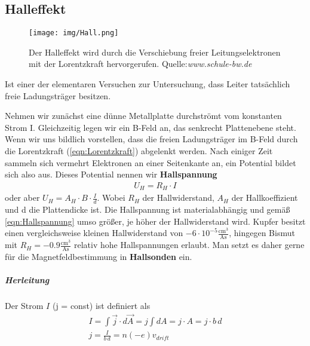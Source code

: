 \subsection{Halleffekt}
\begin{figure}\begin{center}
\texttt{[image: img/Hall.png]}\end{center}
\caption{Der Halleffekt wird durch die Verschiebung freier Leitungselektronen mit der Lorentzkraft hervorgerufen. Quelle:\textit{www.schule-bw.de} }
\label{pic:Halleffekt}
\end{figure}
Ist einer der elementaren Versuchen zur Untersuchung, dass Leiter tatsächlich  freie Ladungsträger besitzen. \par 
Nehmen wir zunächst eine dünne Metallplatte durchströmt vom konstanten Strom I. Gleichzeitig legen wir ein B-Feld an, das senkrecht Plattenebene steht. Wenn wir uns bildlich vorstellen, dass die freien Ladungsträger im B-Feld durch die Lorentzkraft (\ref{eqn:Lorentzkraft}) abgelenkt werden. Nach einiger Zeit sammeln sich vermehrt Elektronen an einer Seitenkante an, ein Potential bildet sich also aus. Dieses Potential nennen wir \textbf{Hallspannung}
\begin{align} \label{eqn:Hallspannung}
\boxed{U_H = R_H \cdot I}
\end{align}oder aber $U_H = A_H \cdot B \cdot \frac{I}{d}$. Wobei $R_H$ der Hallwiderstand, $A_H$ der Hallkoeffizient und d die Plattendicke ist. 
Die Hallspannung ist materialabhängig und  gemäß \ref{eqn:Hallspannung} umso größer, je höher der Hallwiderstand wird. Kupfer besitzt einen vergleichsweise kleinen Hallwiderstand von $-6 \cdot 10^{-5} \mathrm{\frac{cm^3}{As}}$, hingegen Bismut mit $R_H = -0.9\mathrm{\frac{cm^3}{As}}$ relativ hohe Hallspannungen erlaubt. Man setzt es daher gerne für die Magnetfeldbestimmung in \textbf{Hallsonden} ein.

\subparagraph{Herleitung}
Der Strom $I$ (j = const) ist definiert als
\begin{align}
I 			= \int \vec{j} \cdot d\vec{A} = j \int dA = j \cdot A = j \cdot b\,d\\
\boxed{j 	= \frac{I}{b\, d} = n (-e) v_{drift}} \label{eqn:stromdichte_Drift}
\end{align}

